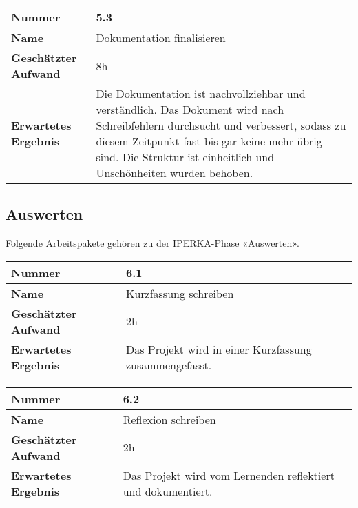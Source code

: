 \begin{longtable}{p{}|p{}}
	\hline
	\textbf{Nummer}                 & \textbf{5.3}            \\
	\hline
	\textbf{Name}   				& Dokumentation finalisieren                  \\
	\hline
	\textbf{Geschätzter Aufwand}    & 8h                                    \\
	\hline
	\textbf{Erwartetes Ergebnis}    & Die Dokumentation ist nachvollziehbar und verständlich. Das Dokument wird nach Schreibfehlern durchsucht und verbessert, sodass zu diesem Zeitpunkt fast bis gar keine mehr übrig sind. Die Struktur ist einheitlich und Unschönheiten wurden behoben.                                    \\
	\hline
\end{longtable}\label{tab:kontrollieren-5.3}

\subsection{Auswerten}
Folgende Arbeitspakete gehören zu der IPERKA-Phase «Auswerten».

\begin{longtable}{p{}|p{}}
	\hline
	\textbf{Nummer}                 & \textbf{6.1}            \\
	\hline
	\textbf{Name}   				& Kurzfassung schreiben                  \\
	\hline
	\textbf{Geschätzter Aufwand}    & 2h                                    \\
	\hline
	\textbf{Erwartetes Ergebnis}    & Das Projekt wird in einer Kurzfassung zusammengefasst.                                    \\
	\hline
\end{longtable}\label{tab:auswerten-6.1}

\begin{longtable}{p{}|p{}}
	\hline
	\textbf{Nummer}                 & \textbf{6.2}            \\
	\hline
	\textbf{Name}   				& Reflexion schreiben                  \\
	\hline
	\textbf{Geschätzter Aufwand}    & 2h                                    \\
	\hline
	\textbf{Erwartetes Ergebnis}    & Das Projekt wird vom Lernenden reflektiert und dokumentiert.                                    \\
	\hline
\end{longtable}\label{tab:auswerten-6.2}

